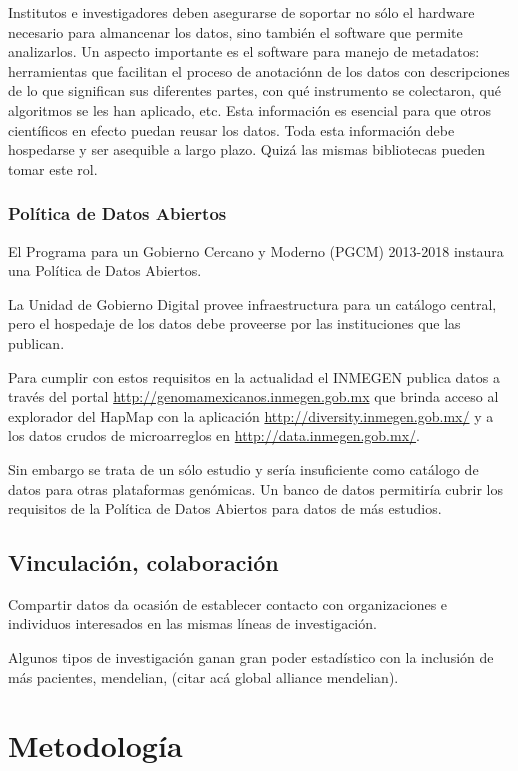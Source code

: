 \documentclass[
10pt, %
letterpaper, %
oneside, %
headinclude,footinclude, %
BCOR5mm, %
]{scrartcl}
\begin{document}
Institutos e investigadores deben asegurarse de soportar no sólo el
hardware necesario para almancenar los datos, sino también el software
que permite analizarlos. Un aspecto importante es el software para
manejo de metadatos: herramientas que facilitan el proceso de
anotaciónn de los datos con descripciones de lo que significan sus
diferentes partes, con qué instrumento se colectaron, qué algoritmos
se les han aplicado, etc. Esta información es esencial para que otros
científicos en efecto puedan reusar los datos. Toda esta información
debe hospedarse y ser asequible a largo plazo. Quizá las mismas
bibliotecas pueden tomar este rol.\cite{said_datas_2009}


\subsubsection{Política de Datos Abiertos}
El Programa para un Gobierno Cercano y Moderno (PGCM) 2013-2018
instaura una Política de Datos Abiertos.

La Unidad de Gobierno Digital provee infraestructura para un catálogo
central, pero el hospedaje de los datos debe proveerse por las
instituciones que las publican.

Para cumplir con estos requisitos en la actualidad el INMEGEN publica
datos a través del portal \url{http://genomamexicanos.inmegen.gob.mx} que
brinda acceso al explorador del HapMap con la aplicación
\url{http://diversity.inmegen.gob.mx/} y a los datos crudos de microarreglos
en \url{http://data.inmegen.gob.mx/}.

Sin embargo se trata de un sólo estudio y sería insuficiente como
catálogo de datos para otras plataformas genómicas. Un banco de datos
permitiría cubrir los requisitos de la Política de Datos Abiertos para
datos de más estudios.


\subsection{Vinculación, colaboración}
Compartir datos da ocasión de establecer contacto con organizaciones e
individuos interesados en las mismas líneas de investigación.

Algunos tipos de investigación ganan gran poder estadístico con la
inclusión de más pacientes, mendelian, (citar acá global alliance
mendelian). 


\section{Metodología}
\end{document}
